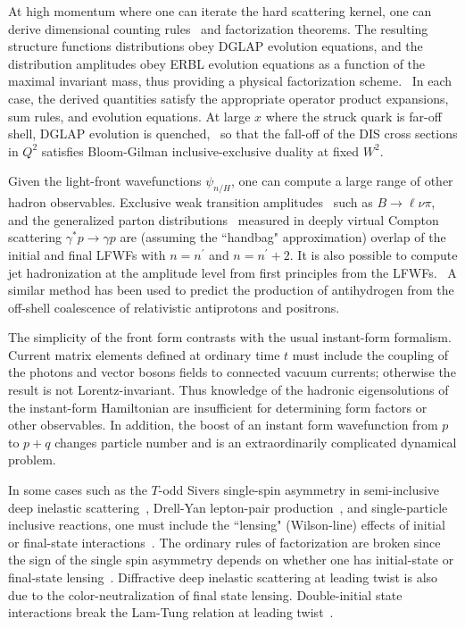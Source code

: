 \documentclass[prd,aps,onecolumn,nofootinbib]{revtex4}
\begin{document}
At high momentum where one can iterate the hard scattering kernel, one can derive dimensional counting rules~\cite{Brodsky:1973kr,Matveev:1973ra}
and factorization theorems.
The resulting structure functions distributions obey  DGLAP  evolution equations, and the distribution amplitudes obey 
ERBL evolution equations as a function of the maximal invariant
mass, thus providing a physical factorization
scheme.~\cite{PHRVA.D1.1} In each case, the derived quantities
satisfy the appropriate operator product expansions, sum rules, and
evolution equations. At large $x$ where the struck quark is
far-off shell, DGLAP evolution is quenched,~\cite{Brodsky} so
that the fall-off of the DIS cross sections in $Q^2$ satisfies Bloom-Gilman
inclusive-exclusive duality at fixed $W^2.$

Given the light-front wavefunctions $\psi_{n/H}$, one can
compute a large range of other hadron
observables. Exclusive weak transition
amplitudes~\cite{Brodsky:1998hn} such as $B\to \ell \nu \pi$,  and
the generalized parton distributions~\cite{Brodsky:2000xy} measured
in deeply virtual Compton scattering  $\gamma^* p \to \gamma p$ are (assuming the ``handbag"
approximation) overlap of the initial and final LFWFs with $n
=n^\prime$ and $n =n^\prime+2$.  
It is also possible to compute jet hadronization at the amplitude level from first principles from the LFWFs.~\cite{Brodsky:2008tk} A similar method has been used to predict the production of antihydrogen from the off-shell coalescence of relativistic antiprotons and positrons.~\cite{Munger:1993kq}


The simplicity of the front form contrasts with the usual instant-form formalism. Current matrix elements defined at ordinary time $t$ must include the coupling of the photons and vector bosons fields  to connected vacuum currents; otherwise the result is not Lorentz-invariant.  Thus knowledge of the hadronic eigensolutions of the instant-form Hamiltonian are insufficient for determining form factors or other observables.   In addition, the boost of an instant form wavefunction from $p$ to $p+q$ changes particle number and is an extraordinarily complicated dynamical problem. 


In some cases such as the $T$-odd Sivers  single-spin asymmetry in semi-inclusive deep inelastic scattering~\cite{Brodsky:2002cx}, Drell-Yan lepton-pair 
production~\cite{Collins:2002kn,Brodsky:2002rv}, and single-particle inclusive reactions, one must include the ``lensing" (Wilson-line) effects of initial or final-state interactions~\cite{Brodsky:2010vs}.  The ordinary rules of factorization are broken since the sign of the single spin asymmetry depends on whether one has initial-state or final-state lensing~\cite{Collins:2002kn,Brodsky:2002rv}.   Diffractive deep inelastic scattering at leading twist is also due to the color-neutralization of final state lensing.  Double-initial state interactions break the Lam-Tung relation at  leading twist~\cite{Boer:2002ju}. 
\end{document}
